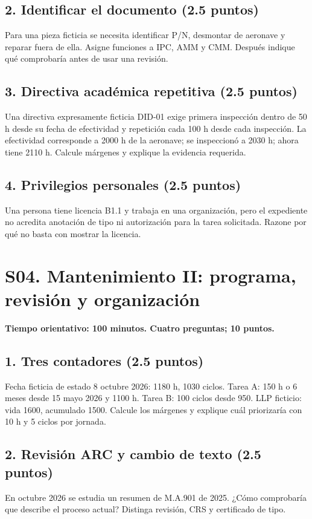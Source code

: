 \section*{2. Identificar el documento (2.5 puntos)}
Para una pieza ficticia se necesita identificar P/N, desmontar de aeronave y reparar fuera de ella. Asigne funciones a IPC, AMM y CMM. Después indique qué comprobaría antes de usar una revisión.

\section*{3. Directiva académica repetitiva (2.5 puntos)}
Una directiva expresamente ficticia DID-01 exige primera inspección dentro de 50 h desde su fecha de efectividad y repetición cada 100 h desde cada inspección. La efectividad corresponde a 2000 h de la aeronave; se inspeccionó a 2030 h; ahora tiene 2110 h. Calcule márgenes y explique la evidencia requerida.

\section*{4. Privilegios personales (2.5 puntos)}
Una persona tiene licencia B1.1 y trabaja en una organización, pero el expediente no acredita anotación de tipo ni autorización para la tarea solicitada. Razone por qué no basta con mostrar la licencia.

\chapter{S04. Mantenimiento II: programa, revisión y organización}
\noindent\textbf{Tiempo orientativo: 100 minutos. Cuatro preguntas; 10 puntos.}
\section*{1. Tres contadores (2.5 puntos)}
Fecha ficticia de estado 8 octubre 2026: 1180 h, 1030 ciclos. Tarea A: 150 h o 6 meses desde 15 mayo 2026 y 1100 h. Tarea B: 100 ciclos desde 950. LLP ficticio: vida 1600, acumulado 1500. Calcule los márgenes y explique cuál priorizaría con 10 h y 5 ciclos por jornada.

\section*{2. Revisión ARC y cambio de texto (2.5 puntos)}
En octubre 2026 se estudia un resumen de M.A.901 de 2025. ¿Cómo comprobaría que describe el proceso actual? Distinga revisión, CRS y certificado de tipo.

